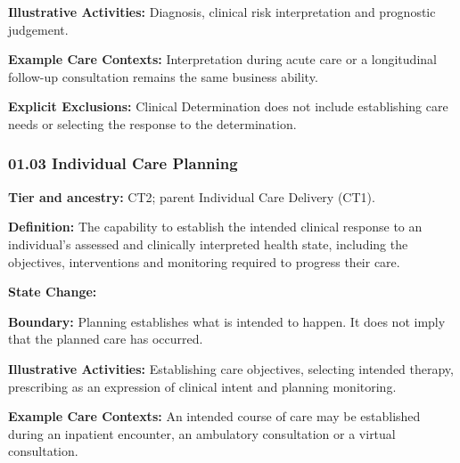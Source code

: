 \textbf{Illustrative Activities:} Diagnosis, clinical risk interpretation and prognostic judgement.

\label{rad:business:203}

\textbf{Example Care Contexts:} Interpretation during acute care or a longitudinal follow-up consultation remains the same business ability.

\label{rad:business:206}

\textbf{Explicit Exclusions:} Clinical Determination does not include establishing care needs or selecting the response to the determination.

\label{rad:business:209}



\label{rad:business:211}
\subsubsection*{01.03 Individual Care Planning}
\label{rad:business:213}

\textbf{Tier and ancestry:} CT2; parent Individual Care Delivery (CT1).

\label{rad:business:215}

\textbf{Definition:} The capability to establish the intended clinical response to an individual's assessed and clinically interpreted health state, including the objectives, interventions and monitoring required to progress their care.

\label{rad:business:219}

\textbf{State Change:} \texttt{}

\label{rad:business:221}

\textbf{Boundary:} Planning establishes what is intended to happen. It does not imply that the planned care has occurred.

\label{rad:business:224}

\textbf{Illustrative Activities:} Establishing care objectives, selecting intended therapy, prescribing as an expression of clinical intent and planning monitoring.

\label{rad:business:227}

\textbf{Example Care Contexts:} An intended course of care may be established during an inpatient encounter, an ambulatory consultation or a virtual consultation.


